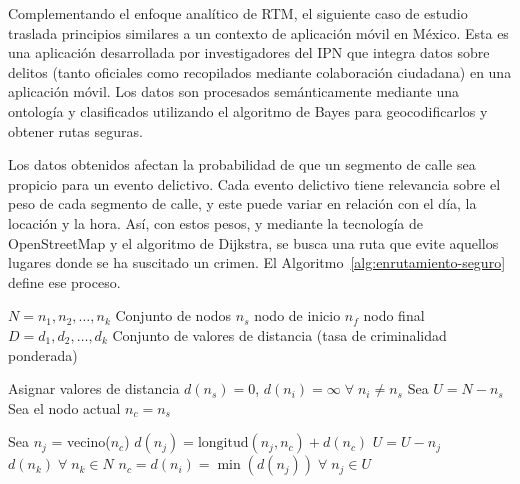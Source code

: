 
Complementando el enfoque analítico de RTM, el siguiente caso de estudio traslada principios similares a un contexto de aplicación móvil en México. Esta es una aplicación desarrollada por investigadores del IPN que integra datos sobre delitos (tanto oficiales como recopilados mediante colaboración ciudadana) en una aplicación móvil. Los datos son procesados semánticamente mediante una ontología y clasificados utilizando el algoritmo de Bayes para geocodificarlos y obtener rutas seguras\cite{TwitterApp2016}.

Los datos obtenidos afectan la probabilidad de que un segmento de calle sea propicio para un evento delictivo. Cada evento delictivo tiene relevancia sobre el peso de cada segmento de calle, y este puede variar en relación con el día, la locación y la hora. Así, con estos pesos, y mediante la tecnología de OpenStreetMap y el algoritmo de Dijkstra, se busca una ruta que evite aquellos lugares donde se ha suscitado un crimen\cite{TwitterApp2016}. El Algoritmo~\ref{alg:enrutamiento-seguro} define ese proceso.

\begin{algorithm}
\caption{El algoritmo de enrutamiento seguro}
\label{alg:enrutamiento-seguro}
\begin{algorithmic}[1]
\REQUIRE $N = n_1, n_2, \dots, n_k$ Conjunto de nodos
\REQUIRE $n_s$ nodo de inicio
\REQUIRE $n_f$ nodo final
\ENSURE $D = d_1, d_2, \dots, d_k$ Conjunto de valores de distancia (tasa de criminalidad ponderada)

\STATE Asignar valores de distancia $d(n_s) = 0$, $d(n_i) = \infty \; \forall \; n_i \neq n_s$
\STATE Sea $U = N - n_s$
\STATE Sea el nodo actual $n_c = n_s$

        \STATE Sea $n_j$ = vecino($n_c$)
            \STATE $d(n_j) = \text{longitud}(n_j, n_c) + d(n_c)$
            \STATE $U = U - n_j$
        \ENDIF
    \ENDFOR
        \RETURN $d(n_k) \; \forall \; n_k \in N$
    \ELSE
        \STATE $n_c = d(n_i) = \min(d(n_j)) \; \forall \; n_j \in U$
    \ENDIF
\ENDWHILE

\end{algorithmic}
\end{algorithm}

